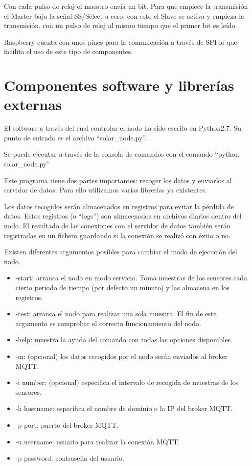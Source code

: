 Con cada pulso de reloj el maestro envía un bit. Para que empiece la transmisión el Master baja la señal SS/Select a cero, con esto el Slave se activa y empieza la transmisión, con un pulso de reloj al mismo tiempo que el primer bit es leído.

Raspberry cuenta con unos pines para la comunicación a través de SPI lo que facilita el uso de este tipo de componentes.

\section{Componentes software y librerías externas}
\label{makereference2.4}
El software a través del cual controlar el nodo ha sido escrito en Python2.7. Su punto de entrada es el archivo ``solar\_node.py''.

Se puede ejecutar a través de la consola de comandos con el comando ``python solar\_node.py''

Este programa tiene dos partes importantes: recoger los datos y enviarlos al servidor de datos. Para ello utilizamos varias librerías ya existentes.

Los datos recogidos serán almacenados en registros para evitar la pérdida de datos. Estos registros (o ``logs'') son almacenados en archivos diarios dentro del nodo. El resultado de las conexiones con el servidor de datos también serán registradas en un fichero guardando si la conexión se realizó con éxito o no.

Existen diferentes argumentos posibles para cambiar el modo de ejecución del nodo.
\begin{itemize}
\item -start: arranca el nodo en modo servicio. Toma muestras de los sensores cada cierto periodo de tiempo (por defecto un minuto) y las almacena en los registros.
\item -test: arranca el nodo para realizar una sola muestra. El fin de este argumento es comprobar el correcto funcionamiento del nodo.
\item -help: muestra la ayuda del comando con todas las opciones disponibles.
\item -m: (opcional) los datos recogidos por el nodo serán enviados al broker MQTT.
\item -i number: (opcional) especifica el intervalo de recogida de muestras de los sensores.
\item -h hostname: especifica el nombre de dominio o la IP del broker MQTT.
\item -p port: puerto del broker MQTT.
\item -u username: usuario para realizar la conexión MQTT.
\item -p password: contraseña del usuario. 
\end{itemize}

